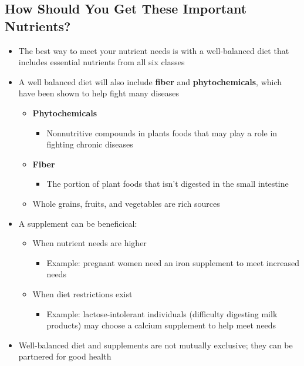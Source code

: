 \documentclass[12pt]{article}
\begin{document}
        \subsection{How Should You Get These Important Nutrients?}
            \begin{itemize}
                \item The best way to meet your nutrient needs is with a well-balanced diet that includes essential nutrients from all six classes
                \item A well balanced diet will also include \textbf{fiber} and \textbf{phytochemicals}, which have been shown to help fight many diseases
                    \begin{itemize}
                        \item \textbf{Phytochemicals}
                            \begin{itemize}
                                \item Nonnutritive compounds in plants foods that may play a role in fighting chronic diseases
                            \end{itemize}
                        \item \textbf{Fiber}
                            \begin{itemize}
                                \item The portion of plant foods that isn't digested in the small intestine
                            \end{itemize}
                        \item Whole grains, fruits, and vegetables are rich sources
                    \end{itemize}
                \item A supplement can be beneficical:
                    \begin{itemize}
                        \item When nutrient needs are higher
                            \begin{itemize}
                                \item Example: pregnant women need an iron supplement to meet increased needs
                            \end{itemize}
                        \item When diet restrictions exist
                            \begin{itemize}
                                \item Example: lactose-intolerant individuals (difficulty digesting milk products) may choose a calcium supplement to help meet needs
                            \end{itemize}
                    \end{itemize}
                \item Well-balanced diet and supplements are not mutually exclusive; they can be partnered for good health
            \end{itemize}
\end{document}
